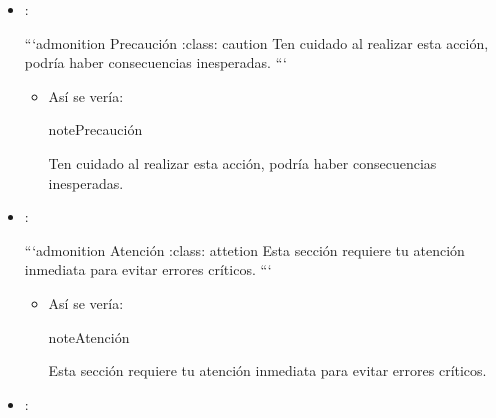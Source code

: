 \documentclass[a4paper,10pt,spanish]{sphinxmanual}
\begin{document}
\begin{itemize}
\begin{itemize}
\begin{sphinxadmonition}{note}{Peligroso}
\sphinxAtStartPar
¡Atención! Esta acción puede ser peligrosa.
\end{sphinxadmonition}

\end{itemize}

\item {} 
\sphinxAtStartPar
{}:

\begin{sphinxVerbatim}[commandchars=\\\{\}]
  ```\PYGZob{}admonition\PYGZcb{} Precaución :class: caution Ten cuidado al realizar esta acción, podría haber consecuencias inesperadas. ```
\end{sphinxVerbatim}
\begin{itemize}
\item {} 
\sphinxAtStartPar
Así se vería:

\begin{sphinxadmonition}{note}{Precaución}

\sphinxAtStartPar
Ten cuidado al realizar esta acción, podría haber consecuencias inesperadas.
\end{sphinxadmonition}

\end{itemize}

\item {} 
\sphinxAtStartPar
{}:

\begin{sphinxVerbatim}[commandchars=\\\{\}]
  ```\PYGZob{}admonition\PYGZcb{} Atención :class: attetion Esta sección requiere tu atención inmediata para evitar errores críticos. ```
\end{sphinxVerbatim}
\begin{itemize}
\item {} 
\sphinxAtStartPar
Así se vería:

\begin{sphinxadmonition}{note}{Atención}

\sphinxAtStartPar
Esta sección requiere tu atención inmediata para evitar errores críticos.
\end{sphinxadmonition}

\end{itemize}

\item {} 
\sphinxAtStartPar
{}:


\end{itemize}
\end{document}
